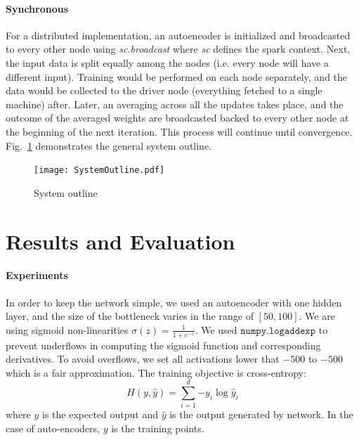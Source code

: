 \documentclass{article}
\begin{document}
\paragraph{Synchronous} For a distributed implementation, an autoencoder is initialized and broadcasted to every other node using \textit{sc.broadcast} where \textit{sc} defines the spark context. Next, the input data is split equally among the nodes (i.e. every node will have a different input). Training would be performed on each node separately, and the data would be collected to the driver node (everything fetched to a single machine) after. Later, an averaging across all the updates takes place, and the outcome of the averaged weights are broadcasted backed to every other node at the beginning of the next iteration. This process will continue until convergence. Fig.~\ref{fig:systemOutline} demonstrates the general system outline.

\begin{figure}
  \caption{System outline}
  \centering
  \texttt{[image: SystemOutline.pdf]}
  \label{fig:systemOutline}
\end{figure}


\section{Results and Evaluation}

\paragraph{Experiments} In order to keep the network simple, we used an autoencoder with one hidden layer, and the size of the bottleneck varies in the range of $[50,100]$. We are using sigmoid non-linearities $\sigma(z) = \frac{1}{1+e^{-z}}$. We used $\texttt{numpy.logaddexp}$ to prevent underflows in computing the sigmoid function and corresponding derivatives. To avoid overflows, we set all activations lower that $-500$ to $-500$ which is a fair approximation. The training objective is cross-entropy: $$H(y,\hat{y}) = \sum_{i=1}^d{-y_i \log{\hat{y}_i}}$$ where $y$ is the expected output and $\hat{y}$ is the output generated by network. In the case of auto-encoders, $y$ is the training points. 
\end{document}
